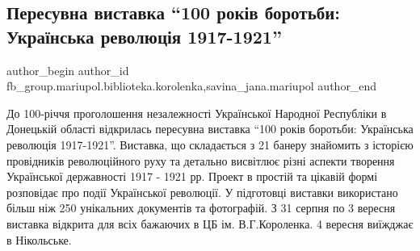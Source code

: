  
 
 
 
 

\subsection{Пересувна виставка \enquote{100 років боротьби: Українська революція 1917-1921}}
\label{sec:31_08_2018.fb.fb_group.mariupol.biblioteka.korolenka.1.peresuvna_vistavka__}
 
\ifcmt
 author_begin
   author_id fb_group.mariupol.biblioteka.korolenka,savina_jana.mariupol
 author_end
\fi

До 100-річчя проголошення незалежності Української Народної Республіки в
Донецькій області відкрилась пересувна виставка \enquote{100 років боротьби: Українська
революція 1917-1921}. Виставка, що складається з 21 банеру знайомить з історією
провідників революційного руху та детально висвітлює різні аспекти творення
Української державності 1917 - 1921 рр. Проект в простій та цікавій формі
розповідає про події Української революції. У підготовці виставки використано
більш ніж 250 унікальних документів та фотографій.  З 31 серпня по 3 вересня
виставка відкрита для всіх бажаючих в ЦБ ім. В.Г.Короленка. 4 вересня виїжджає
в Нікольське.
